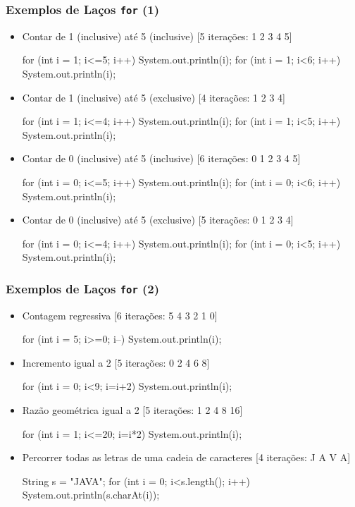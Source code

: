 \documentclass[xcolor={dvipsnames,table},aspectratio=169]{beamer}
\begin{document}
\begin{frame}[fragile]\frametitle{Exemplos de Laços \texttt{for} (1)}
\begin{itemize}
\item Contar de 1 (inclusive) até 5 (inclusive) [5 iterações: 1 2 3 4 5]
{\scriptsize
\begin{javacode}
for (int i = 1; i<=5; i++) System.out.println(i);
for (int i = 1; i<6; i++) System.out.println(i);
\end{javacode}
}
\item Contar de 1 (inclusive) até 5 (exclusive) [4 iterações: 1 2 3 4]
{\scriptsize
\begin{javacode}
for (int i = 1; i<=4; i++) System.out.println(i);
for (int i = 1; i<5; i++) System.out.println(i);
\end{javacode}
}
\item Contar de 0 (inclusive) até 5 (inclusive) [6 iterações: 0 1 2 3 4 5]
{\scriptsize
\begin{javacode}
for (int i = 0; i<=5; i++) System.out.println(i);
for (int i = 0; i<6; i++) System.out.println(i);
\end{javacode}
}
\item Contar de 0 (inclusive) até 5 (exclusive) [5 iterações: 0 1 2 3 4]
{\scriptsize
\begin{javacode}
for (int i = 0; i<=4; i++) System.out.println(i);
for (int i = 0; i<5; i++) System.out.println(i);
\end{javacode}
}
\end{itemize}
\end{frame}

\begin{frame}[fragile]\frametitle{Exemplos de Laços \texttt{for} (2)}
\begin{itemize}
\item Contagem regressiva [6 iterações: 5 4 3 2 1 0]
{\scriptsize
\begin{javacode}
for (int i = 5; i>=0; i--) System.out.println(i);
\end{javacode}
}
\item Incremento igual a 2 [5 iterações: 0 2 4 6 8]
{\scriptsize
\begin{javacode}
for (int i = 0; i<9; i=i+2) System.out.println(i);
\end{javacode}
}
\item Razão geométrica igual a 2 [5 iterações: 1 2 4 8 16]
{\scriptsize
\begin{javacode}
for (int i = 1; i<=20; i=i*2) System.out.println(i);
\end{javacode}
}
\item Percorrer todas as letras de uma cadeia de caracteres [4 iterações: J A V A]
{\scriptsize
\begin{javacode}
String s = "JAVA";
for (int i = 0; i<s.length(); i++) System.out.println(s.charAt(i));
\end{javacode}
}
\end{itemize}
\end{frame}
\end{document}
